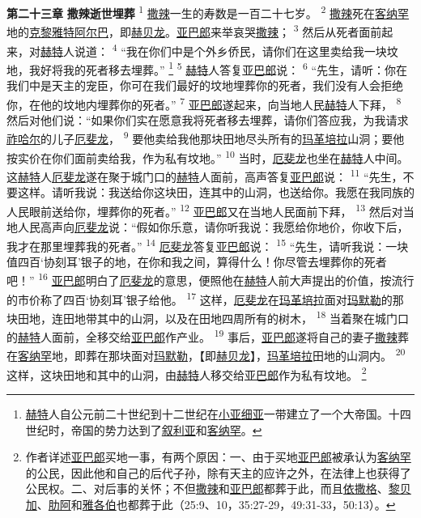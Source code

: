 \textbf{第二十三章 }
\textbf{撒辣逝世埋葬 }
\textsuperscript{1}
\uline{撒辣}一生的寿数是一百二十七岁。
\textsuperscript{2}
\uline{撒辣}死在\uline{客纳罕}地的\uline{克黎雅特阿尔巴}，即\uline{赫贝龙}。\uline{亚巴郎}来举哀哭\uline{撒辣}；
\textsuperscript{3}
然后从死者面前起来，对\uline{赫特}人说道：
\textsuperscript{4}
“我在你们中是个外乡侨民，请你们在这里卖给我一块坟地，我好将我的死者移去埋葬。”
\footnote{\uline{赫特}人自公元前二十世纪到十二世纪在\uline{小亚细亚}一带建立了一个大帝国。十四世纪时，帝国的势力达到了\uline{叙利亚}和\uline{客纳罕}。}
\textsuperscript{5}
\uline{赫特}人答复\uline{亚巴郎}说：
\textsuperscript{6}
“先生，请听：你在我们中是天主的宠臣，你可在我们最好的坟地埋葬你的死者，我们没有人会拒绝你，在他的坟地内埋葬你的死者。”
\textsuperscript{7}
\uline{亚巴郎}遂起来，向当地人民\uline{赫特}人下拜，
\textsuperscript{8}
然后对他们说：“如果你们实在愿意我将死者移去埋葬，请你们答应我，为我请求\uline{祚哈尔}的儿子\uline{厄斐龙}，
\textsuperscript{9}
要他卖给我他那块田地尽头所有的\uline{玛革}\uline{培拉}山洞；要他按实价在你们面前卖给我，作为私有坟地。”
\textsuperscript{10}
当时，\uline{厄斐龙}也坐在\uline{赫特}人中间。这\uline{赫特}人\uline{厄斐龙}遂在聚于城门口的\uline{赫特}人面前，高声答复\uline{亚巴郎}说：
\textsuperscript{11}
“先生，不要这样。请听我说：我送给你这块田，连其中的山洞，也送给你。我愿在我同族的人民眼前送给你，埋葬你的死者。”
\textsuperscript{12}
\uline{亚巴郎}又在当地人民面前下拜，
\textsuperscript{13}
然后对当地人民高声向\uline{厄斐龙}说：“假如你乐意，请你听我说：我愿给你地价，你收下后，我才在那里埋葬我的死者。”
\textsuperscript{14}
\uline{厄斐龙}答复\uline{亚巴郎}说：
\textsuperscript{15}
“先生，请听我说：一块值四百‘协刻耳’银子的地，在你和我之间，算得什么！你尽管去埋葬你的死者吧！”
\textsuperscript{16}
\uline{亚巴郎}明白了\uline{厄斐龙}的意思，便照他在\uline{赫特}人前大声提出的价值，按流行的市价称了四百‘协刻耳’银子给他。
\textsuperscript{17}
这样，\uline{厄斐龙}在\uline{玛革}\uline{培拉}面对\uline{玛默勒}的那块田地，连田地带其中的山洞，以及在田地四周所有的树木，
\textsuperscript{18}
当着聚在城门口的\uline{赫特}人面前，全移交给\uline{亚巴郎}作产业。
\textsuperscript{19}
事后，\uline{亚巴郎}遂将自己的妻子\uline{撒辣}葬在\uline{客纳罕}地，即葬在那块面对\uline{玛默勒}，【即\uline{赫贝龙}】，\uline{玛革}\uline{培拉}田地的山洞内。
\textsuperscript{20}
这样，这块田地和其中的山洞，由\uline{赫特}人移交给\uline{亚巴郎}作为私有坟地。
\footnote{作者详述\uline{亚巴郎}买地一事，有两个原因：一、由于买地\uline{亚巴郎}被承认为\uline{客纳罕}的公民，因此他和自己的后代子孙，除有天主的应许之外，在法律上也获得了公民权。二、对后事的关怀；不但\uline{撒辣}和\uline{亚巴郎}都葬于此，而且\uline{依撒格}、\uline{黎贝加}、\uline{肋阿}和\uline{雅各伯}也都葬于此（25:9、10，35:27-29，49:31-33，50:13）。}

